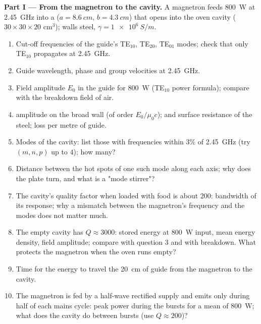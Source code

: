 \begin{problem}
\medskip
\noindent\textbf{Part I --- From the magnetron to the cavity.}
A magnetron feeds \qty{800}{W} at \qty{2.45}{GHz} into a  ($a = \qty{8.6}{cm}$, $b = \qty{4.3}{cm}$) that opens into the oven
cavity ($30 \times 30 \times 20$ cm$^3$); walls steel, $\gamma = \qty{1e6}{S/m}$.
\begin{enumerate}
  \item Cut-off frequencies of the guide's TE$_{10}$, TE$_{20}$, TE$_{01}$
        modes; check that only TE$_{10}$ propagates at \qty{2.45}{GHz}.
  \item Guide wavelength, phase and group velocities at \qty{2.45}{GHz}.
  \item Field amplitude $E_0$ in the guide for \qty{800}{W} (TE$_{10}$ power
        formula); compare with the breakdown field of air.
  \item {} amplitude on the broad wall (of order
        $E_0/\mu_0c$);  and surface resistance of the steel;
        loss per metre of guide.
  \item Modes of the cavity: list those with frequencies within $3\%$
        of \qty{2.45}{GHz} (try $(m, n, p)$ up to $4$); how many?
  \item Distance between the hot spots of one such mode along each
        axis; why does the plate turn, and what is a "mode stirrer"?
  \item The cavity's quality factor when loaded with food is about
        $200$: bandwidth of its response; why a mismatch between the
        magnetron's frequency and the modes does not matter much.
  \item The empty cavity has $Q \approx 3000$: stored energy at \qty{800}{W}
        input, mean energy density, field amplitude; compare with
        question 3 and with breakdown. What protects the magnetron
        when the oven runs empty?
  \item Time for the energy to travel the \qty{20}{cm} of guide from
        the magnetron to the cavity.
  \item The magnetron is fed by a half-wave rectified supply and emits
        only during half of each mains cycle: peak power during the
        bursts for a mean of \qty{800}{W}; what does the cavity do
        between bursts (use $Q \approx 200$)?
\end{enumerate}


\end{problem}
